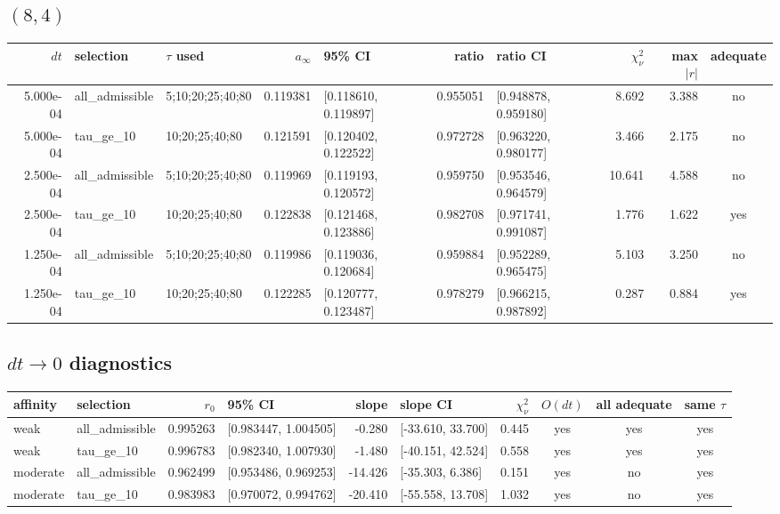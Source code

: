 \documentclass[10pt]{article}
\begin{document}
\begin{landscape}
\subsection*{$(8,4)$}
\begin{longtable}{r l l r l r l r r c}
\toprule
$dt$ & selection & $\tau$ used & $a_\infty$ & 95\% CI & ratio & ratio CI & $\chi^2_\nu$ & max $|r|$ & adequate\\
\midrule
\endfirsthead
5.000e-04 & all\_admissible & 5;10;20;25;40;80 & 0.119381 & [0.118610, 0.119897] & 0.955051 & [0.948878, 0.959180] & 8.692 & 3.388 & no \\
5.000e-04 & tau\_ge\_10 & 10;20;25;40;80 & 0.121591 & [0.120402, 0.122522] & 0.972728 & [0.963220, 0.980177] & 3.466 & 2.175 & no \\
2.500e-04 & all\_admissible & 5;10;20;25;40;80 & 0.119969 & [0.119193, 0.120572] & 0.959750 & [0.953546, 0.964579] & 10.641 & 4.588 & no \\
2.500e-04 & tau\_ge\_10 & 10;20;25;40;80 & 0.122838 & [0.121468, 0.123886] & 0.982708 & [0.971741, 0.991087] & 1.776 & 1.622 & yes \\
1.250e-04 & all\_admissible & 5;10;20;25;40;80 & 0.119986 & [0.119036, 0.120684] & 0.959884 & [0.952289, 0.965475] & 5.103 & 3.250 & no \\
1.250e-04 & tau\_ge\_10 & 10;20;25;40;80 & 0.122285 & [0.120777, 0.123487] & 0.978279 & [0.966215, 0.987892] & 0.287 & 0.884 & yes \\
\bottomrule
\end{longtable}

\subsection*{$dt\to0$ diagnostics}
\begin{longtable}{l l r l r l r c c c}
\toprule
affinity & selection & $r_0$ & 95\% CI & slope & slope CI & $\chi^2_\nu$ & $O(dt)$ & all adequate & same $\tau$\\
\midrule
\endfirsthead
weak & all\_admissible & 0.995263 & [0.983447, 1.004505] & -0.280 & [-33.610, 33.700] & 0.445 & yes & yes & yes \\
weak & tau\_ge\_10 & 0.996783 & [0.982340, 1.007930] & -1.480 & [-40.151, 42.524] & 0.558 & yes & yes & yes \\
moderate & all\_admissible & 0.962499 & [0.953486, 0.969253] & -14.426 & [-35.303, 6.386] & 0.151 & yes & no & yes \\
moderate & tau\_ge\_10 & 0.983983 & [0.970072, 0.994762] & -20.410 & [-55.558, 13.708] & 1.032 & yes & no & yes \\
\bottomrule
\end{longtable}
\normalsize
\end{landscape}
\end{document}
